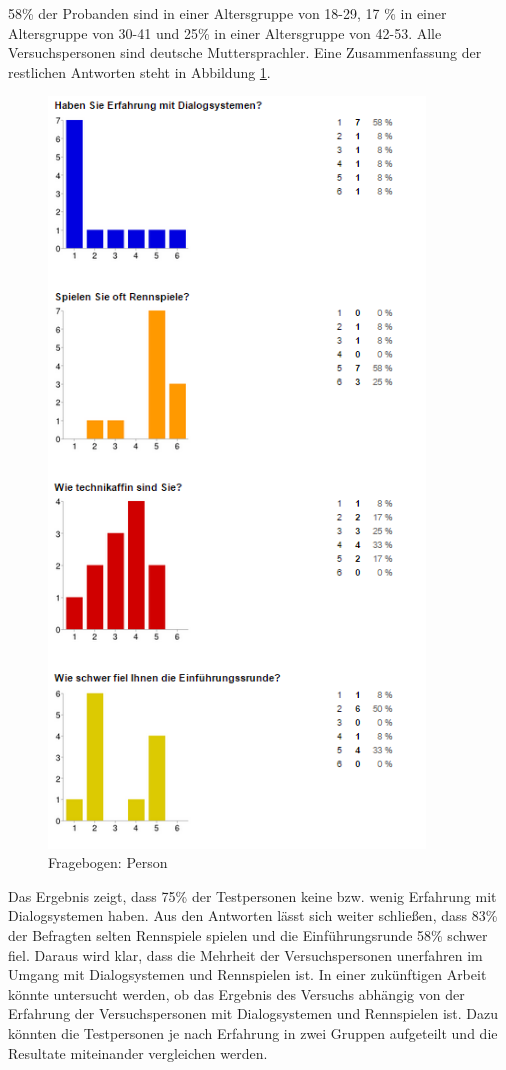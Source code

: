 \documentclass[12pt,a4paper]{scrartcl}
\begin{document}
58\% der Probanden sind in einer Altersgruppe von 18-29, 17 \% in einer Altersgruppe von 30-41 und 25\% in einer Altersgruppe von 42-53. Alle Versuchspersonen sind deutsche Muttersprachler. 
Eine Zusammenfassung der restlichen Antworten steht in Abbildung \ref{fbpersonaus}.


\begin{figure}[H]
\begin{center}
\includegraphics[width=10cm]{person1.png}
\caption{Fragebogen: Person}
\label{fbpersonaus}
\end{center}
\end{figure}
\newpage

Das Ergebnis zeigt, dass 75\% der Testpersonen keine bzw. wenig Erfahrung mit Dialogsystemen haben. Aus den Antworten lässt sich weiter schließen, dass 83\% der Befragten selten Rennspiele spielen und die Einführungsrunde 58\% schwer fiel. Daraus wird klar, dass die Mehrheit der Versuchspersonen unerfahren im Umgang mit Dialogsystemen und Rennspielen ist. In einer zukünftigen Arbeit könnte untersucht werden, ob das Ergebnis des Versuchs abhängig von der Erfahrung der Versuchspersonen mit Dialogsystemen und Rennspielen ist. Dazu könnten die Testpersonen je nach Erfahrung in zwei Gruppen aufgeteilt und die Resultate miteinander vergleichen werden. 
\end{document}
